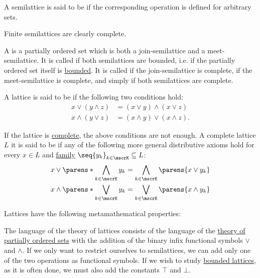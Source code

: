 \begin{definition}
\begin{thmenum}[series=def:semilattice]
    A semilattice is said to be  if the corresponding operation is defined for arbitrary sets.

    Finite semilattices are clearly complete.

     A  is a partially ordered set which is both a join-semilattice and a meet-semilattice. It is called  if both semilattices are bounded, i.e. if the partially ordered set itself is \hyperref[def:partially_ordered_set_extremal_points/top_and_bottom]{bounded}. It is called  if the join-semilattice is complete,  if the meet-semilattice is complete, and simply  if both semilattices are complete.

     A lattice is said to be  if the following two conditions hold:
    \begin{align}
      x \vee (y \wedge z) &= (x \vee y) \wedge (x \vee z) \label{eq:def:semilattice/distributive_lattice/finite/join_over_meet} \\
      x \wedge (y \vee z) &= (x \wedge y) \vee (x \wedge z) \label{eq:def:semilattice/distributive_lattice/finite/meet_over_join}.
    \end{align}

    If the lattice is \hyperref[def:semilattice/complete]{complete}, the above conditions are not enough. A complete lattice \( L \) it is said to be  if any of the following more general distributive axioms hold for every \( x \in L \) and \hyperref[def:cartesian_product/indexed_family]{family} \( \seq{ y_k }_{k \in \mscrK} \subseteq L \):
    \begin{align}
      x \vee \parens*{ \bigwedge_{k \in \mscrK} y_k } &= \bigwedge_{k \in \mscrK} \parens{ x \vee y_k } \label{eq:def:semilattice/distributive_lattice/arbitrary/join_over_meet} \\
      x \wedge \parens*{ \bigvee_{k \in \mscrK} y_k } &= \bigvee_{k \in \mscrK} \parens{ x \wedge y_k } \label{eq:def:semilattice/distributive_lattice/arbitrary/meet_over_join}
    \end{align}
  \end{thmenum}

  Lattices have the following metamathematical properties:
  \begin{thmenum}[resume=def:semilattice]
     The language of the theory of lattices consists of the language of the \hyperref[def:partially_ordered_set/theory]{theory of partially ordered sets} with the addition of the binary infix functional symbols \( \vee \) and \( \wedge \). If we only want to restrict ourselves to semilattices, we can add only one of the two operations as functional symbols. If we wish to study \hyperref[def:semilattice/bounded]{bounded lattices}, as it is often done, we must also add the constants \( \top \) and \( \bot \).


\end{thmenum}
\end{definition}
